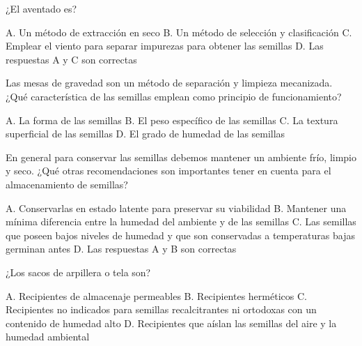 \documentclass[11pt]{exam}
\begin{document}
{\begin{questions}
\begin{checkboxes}
  \end{checkboxes}
\question ¿El aventado es?
  \begin{checkboxes}
    \choice A. Un método de extracción en seco
    \choice B. Un método de selección y clasificación
    \choice C. Emplear el viento para separar impurezas para obtener las semillas
    \CorrectChoice D. Las respuestas A y C son correctas
  \end{checkboxes}
\question Las mesas de gravedad son un método de separación y limpieza mecanizada. ¿Qué
  característica de las semillas emplean como principio de funcionamiento?
  \begin{checkboxes}
    \choice A. La forma de las semillas
    \CorrectChoice B. El peso específico de las semillas
    \choice C. La textura superficial de las semillas
    \choice D. El grado de humedad de las semillas
  \end{checkboxes}
\question En general para conservar las semillas debemos mantener un ambiente frío, limpio
  y seco. ¿Qué otras recomendaciones son importantes tener en cuenta para el
  almacenamiento de semillas?
  \begin{checkboxes}
    \choice A. Conservarlas en estado latente para preservar su viabilidad
    \choice B. Mantener una mínima diferencia entre la humedad del ambiente y de las
    semillas
    \choice C. Las semillas que poseen bajos niveles de humedad y que son conservadas a
    temperaturas bajas germinan antes
    \CorrectChoice D. Las respuestas A y B son correctas
  \end{checkboxes}
\question ¿Los sacos de arpillera o tela son?
  \begin{checkboxes}
    \CorrectChoice A. Recipientes de almacenaje permeables
    \choice B. Recipientes herméticos
    \choice C. Recipientes no indicados para semillas recalcitrantes ni ortodoxas con un
    contenido de humedad alto
    \choice D. Recipientes que aíslan las semillas del aire y la humedad ambiental
  \end{checkboxes}
\end{questions}
}
\end{document}
